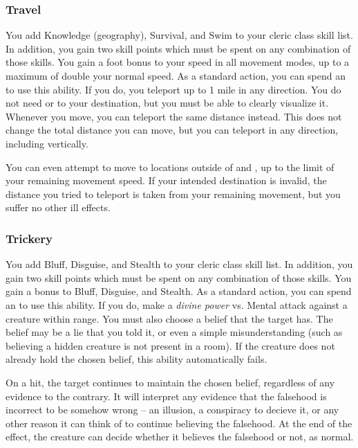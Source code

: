         \subsubsection{Travel}
             You add Knowledge (geography), Survival, and Swim to your cleric class skill list.
            In addition, you gain two skill points which must be spent on any combination of those skills.
             You gain a  foot bonus to your speed in all movement modes, up to a maximum of double your normal speed.
             As a standard action, you can spend an  to use this ability.
            If you do, you teleport up to 1 mile in any direction.
            You do not need  or  to your destination, but you must be able to clearly visualize it.
             Whenever you move, you can teleport the same distance instead.
            This does not change the total distance you can move, but you can teleport in any direction, including vertically.

            You can even attempt to move to locations outside of  and , up to the limit of your remaining movement speed.
            If your intended destination is invalid, the distance you tried to teleport is taken from your remaining movement, but you suffer no other ill effects.

        \subsubsection{Trickery}
             You add Bluff, Disguise, and Stealth to your cleric class skill list.
            In addition, you gain two skill points which must be spent on any combination of those skills.
             You gain a  bonus to Bluff, Disguise, and Stealth.
             As a standard action, you can spend an  to use this ability.
            If you do, make a \textit{divine power} vs. Mental attack against a creature within \rngmed range.
            You must also choose a belief that the target has.
            The belief may be a lie that you told it, or even a simple misunderstanding (such as believing a hidden creature is not present in a room).
            If the creature does not already hold the chosen belief, this ability automatically fails.

            On a hit, the target continues to maintain the chosen belief, regardless of any evidence to the contrary.
            It will interpret any evidence that the falsehood is incorrect to be somehow wrong -- an illusion, a conspiracy to decieve it, or any other reason it can think of to continue believing the falsehood.
            At the end of the effect, the creature can decide whether it believes the falsehood or not, as normal.

